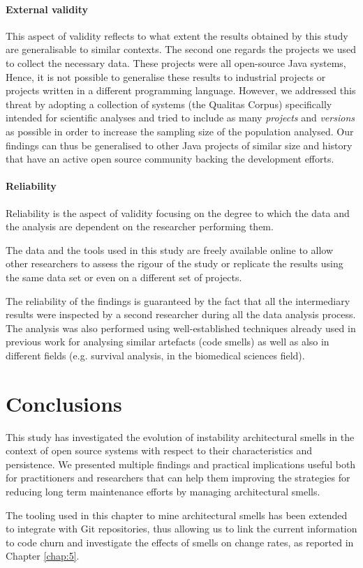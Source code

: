 \paragraph{External validity}
This aspect of validity reflects to what extent the results obtained by this study are generalisable to similar contexts.
The second one regards the projects we used to collect the necessary data. These projects were all open-source Java systems, Hence, it is not possible to generalise these results to industrial projects or projects written in a different programming language.
However, we addressed this threat by adopting a collection of systems (the Qualitas Corpus) specifically intended for scientific analyses and tried to include as many \emph{projects} and \emph{versions} as possible in order to increase the sampling size of the population analysed.
Our findings can thus be generalised to other Java projects of similar size and history that have an active open source community backing the development efforts.

\paragraph{Reliability}
Reliability is the aspect of validity focusing on the degree to which the data and the analysis are dependent on the researcher performing them.

The data and the tools used in this study are freely available online to allow other researchers to assess the rigour of the study or replicate the results using the same data set or even on a different set of projects.

The reliability of the findings is guaranteed by the fact that all the intermediary results were inspected by a second researcher during all the data analysis process.
The analysis was also performed using well-established techniques already used in previous work for analysing similar artefacts (code smells) as well as also in different fields (e.g. survival analysis, in the biomedical sciences field).

\section{Conclusions}\label{c2:sec:conclusions}
This study has investigated the evolution of instability architectural smells in the context of open source systems with respect to their characteristics and persistence.
We presented multiple findings and practical implications useful both for practitioners and researchers that can help them improving the strategies for reducing long term maintenance efforts by managing architectural smells.

The tooling used in this chapter to mine architectural smells has been extended to integrate with Git repositories, thus allowing us to link the current information to code churn and investigate the effects of smells on change rates, as reported in Chapter \ref{chap:5}.

